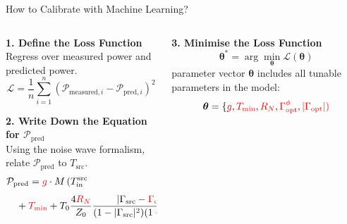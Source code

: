 \documentclass[aspectratio=169]{beamer}
\begin{document}
\begin{frame}{How to Calibrate with Machine Learning?}\footnotesize
	\begin{columns}
		\begin{column}{0.5\textwidth}
			\textbf{1. Define the Loss Function}\\
			Regress over measured power and predicted power.\\
			\begin{equation}
				\mathcal{L} = \frac{1}{n}\sum_{i=1}^{n} \left( \mathcal{P}_{\text{measured},i} - \mathcal{P}_{\text{pred},i} \right)^{2}
			\end{equation}

			\vspace{0.5cm} %

			\textbf{2. Write Down the Equation for \(\mathcal{P}_{\text{pred}}\)}\\
			Using the noise wave formalism, relate \(\mathcal{P}_{\text{pred}}\) to \(T_{\text{src}}\).
			\begin{align}
				 & \mathcal{P}_{\text{pred}} = \textcolor{red}{g} \cdot M \left( T_{\text{in}}^{\text{src}} \right. \nonumber                                                                                                               \\
				 & \quad + \textcolor{red}{T_{\text{min}}} + T_0 \frac{4\textcolor{red}{R_N}}{Z_0} \frac{|\Gamma_{\text{src}} - \textcolor{red}{\Gamma_{\text{opt}}}|^2}{(1 - |\Gamma_{\text{src}}|^2)(1 + |\Gamma_{\text{opt}}|^2)} \Bigg)
			\end{align}
			\vfill
		\end{column}

		\begin{column}{0.5\textwidth}
			\textbf{3. Minimise the Loss Function}
			\begin{equation}
				\boldsymbol{\theta}^* = \arg\min_{\boldsymbol{\theta}} \mathcal{L}(\boldsymbol{\theta})
			\end{equation}
			parameter vector \(\boldsymbol{\theta}\) includes all tunable parameters in the model:
			\begin{equation}
				\boldsymbol{\theta} = \{ \textcolor{red}{g}, \textcolor{red}{T_{\text{min}}}, \textcolor{red}{R_N}, \textcolor{red}{\Gamma_{\text{opt}}^{\phi}}, \textcolor{red}{|\Gamma_{\text{opt}}|)}
			\end{equation}


\end{column}
\end{columns}
\end{frame}
\end{document}
